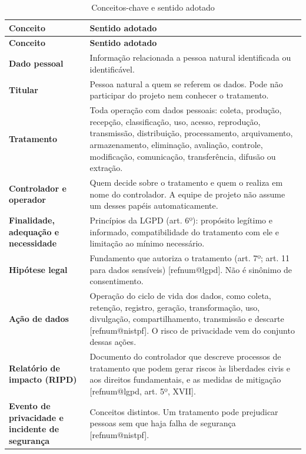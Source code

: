 \documentclass[11pt,a4paper]{article}
\makeatletter
\newcommand{\refnum}[1]{\csname refnum@#1\endcsname}
\newcommand{\cit}[1]{[\refnum{#1}]}
\newcommand{\SingleSpacing}{}
\newcommand{\fontetab}[1]{\par\vspace{3pt}{\small\noindent Fonte: #1\par}}
\makeatother
\begin{document}
\begingroup\SingleSpacing\small
\begin{longtable}{@{}>{\raggedright\arraybackslash}p{}>{\raggedright\arraybackslash}p{}@{}}
\caption{Conceitos-chave e sentido adotado}\label{tab:t2}\\
\toprule
\textbf{Conceito} & \textbf{Sentido adotado}\\
\midrule
\endfirsthead
\toprule
\textbf{Conceito} & \textbf{Sentido adotado}\\
\midrule
\endhead
\bottomrule
\endfoot
\bottomrule
\endlastfoot
\textbf{Dado pessoal} & Informação relacionada a pessoa natural identificada ou identificável.\\[3pt]
\textbf{Titular} & Pessoa natural a quem se referem os dados. Pode não participar do projeto nem conhecer o tratamento.\\[3pt]
\textbf{Tratamento} & Toda operação com dados pessoais: coleta, produção, recepção, classificação, uso, acesso, reprodução, transmissão, distribuição, processamento, arquivamento, armazenamento, eliminação, avaliação, controle, modificação, comunicação, transferência, difusão ou extração.\\[3pt]
\textbf{Controlador e operador} & Quem decide sobre o tratamento e quem o realiza em nome do controlador. A equipe de projeto não assume um desses papéis automaticamente.\\[3pt]
\textbf{Finalidade, adequação e necessidade} & Princípios da LGPD (art. 6º): propósito legítimo e informado, compatibilidade do tratamento com ele e limitação ao mínimo necessário.\\[3pt]
\textbf{Hipótese legal} & Fundamento que autoriza o tratamento (art. 7º; art. 11 para dados sensíveis) [\refnum{lgpd}]. Não é sinônimo de consentimento.\\[3pt]
\textbf{Ação de dados} & Operação do ciclo de vida dos dados, como coleta, retenção, registro, geração, transformação, uso, divulgação, compartilhamento, transmissão e descarte [\refnum{nistpf}]. O risco de privacidade vem do conjunto dessas ações.\\[3pt]
\textbf{Relatório de impacto (RIPD)} & Documento do controlador que descreve processos de tratamento que podem gerar riscos às liberdades civis e aos direitos fundamentais, e as medidas de mitigação [\refnum{lgpd}, art. 5º, XVII].\\[3pt]
\textbf{Evento de privacidade e incidente de segurança} & Conceitos distintos. Um tratamento pode prejudicar pessoas sem que haja falha de segurança [\refnum{nistpf}].\\[3pt]
\end{longtable}
\endgroup
\fontetab{Elaborado pelos autores (2026), a partir de \cit{lgpd} e \cit{nistpf}.}
\end{document}
